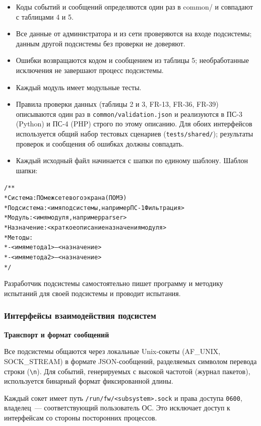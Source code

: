\documentclass[13pt,a4paper,final]{article}
\begin{document}
	\begin{itemize}
		\item Коды событий и сообщений определяются один раз в common/ и совпадают с таблицами 4 и 5.
		\item Все данные от администратора и из сети проверяются на входе подсистемы; данным другой подсистемы без проверки не доверяют.
		\item Ошибки возвращаются кодом и сообщением из таблицы 5; необработанные исключения не завершают процесс подсистемы.
		\item Каждый модуль имеет модульные тесты.
		\item Правила проверки данных (таблицы 2 и 3, FR-13, FR-36, FR-39) описываются один раз в \texttt{common/validation.json} и реализуются в ПС-3 (Python) и ПС-4 (PHP) строго по этому описанию. Для обоих интерфейсов используется общий набор тестовых сценариев (\texttt{tests/shared/}); результаты проверок и сообщения об ошибках должны совпадать.
		\item Каждый исходный файл начинается с шапки по единому шаблону. Шаблон шапки:
	\end{itemize}
	
	\begin{alltt}
		/**
		\textcolor{edit}{* Система:     ПО межсетевого экрана (ПО МЭ)}
		* Подсистема: <имя подсистемы, например ПС-1 Фильтрация>
		* Модуль:      <имя модуля, например parser>
		* Назначение:  <краткое описание назначения модуля>
		* Методы:
		*   - <имя метода 1> — <назначение>
		*   - <имя метода 2> — <назначение>
		*/
	\end{alltt}
	
	Разработчик подсистемы самостоятельно пишет программу и методику испытаний для своей подсистемы и проводит испытания.
	
	\subsubsection{Интерфейсы взаимодействия подсистем}
	
	\textbf{Транспорт и формат сообщений}
	
	Все подсистемы общаются через локальные Unix-сокеты (AF\_UNIX, SOCK\_STREAM) в формате JSON-сообщений, разделяемых символом перевода строки (\texttt{\textbackslash n}). Для событий, генерируемых с высокой частотой (журнал пакетов), используется бинарный формат фиксированной длины.
	
	Каждый сокет имеет путь \texttt{/run/fw/<subsystem>.sock} и права доступа \texttt{0600}, владелец~--- соответствующий пользователь ОС. Это исключает доступ к интерфейсам со стороны посторонних процессов.
	
\end{document}
